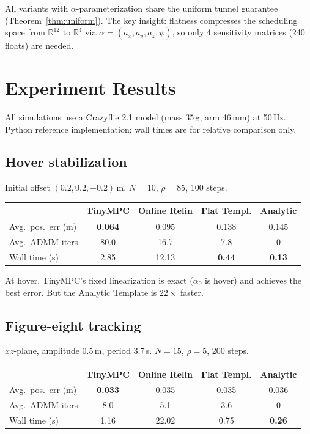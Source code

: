 \documentclass[11pt]{article}
\newcommand{\R}{\mathbb{R}}
\begin{document}
\noindent
All variants with $\alpha$-parameterization share the
uniform tunnel guarantee (Theorem~\ref{thm:uniform}).
The key insight: flatness compresses the scheduling space
from $\R^{12}$ to $\R^4$ via
$\alpha = (a_x, a_y, a_z, \psi)$,
so only 4 sensitivity matrices (240 floats) are needed.

\section{Experiment Results}\label{sec:results}

All simulations use a Crazyflie 2.1 model
(mass 35\,g, arm 46\,mm) at 50\,Hz.
Python reference implementation; wall times are
for relative comparison only.

\subsection{Hover stabilization}

Initial offset $(0.2, 0.2, -0.2)$\,m.
$N=10$, $\rho=85$, 100 steps.

\begin{center}
\renewcommand{\arraystretch}{1.2}
\begin{tabular}{@{}lcccc@{}}
\toprule
 & TinyMPC & Online Relin & Flat Templ. & Analytic \\
\midrule
Avg.\ pos.\ err (m) & \textbf{0.064} & 0.095 & 0.138 & 0.145 \\
Avg.\ ADMM iters     & 80.0 & 16.7 & 7.8 & 0 \\
Wall time (s)        & 2.85 & 12.13 & \textbf{0.44} & \textbf{0.13} \\
\bottomrule
\end{tabular}
\end{center}

At hover, TinyMPC's fixed linearization is exact
($\alpha_0$ is hover) and achieves the best error.
But the Analytic Template is $22\times$ faster.

\subsection{Figure-eight tracking}

$xz$-plane, amplitude 0.5\,m, period 3.7\,s.
$N=15$, $\rho=5$, 200 steps.

\begin{center}
\renewcommand{\arraystretch}{1.2}
\begin{tabular}{@{}lcccc@{}}
\toprule
 & TinyMPC & Online Relin & Flat Templ. & Analytic \\
\midrule
Avg.\ pos.\ err (m) & \textbf{0.033} & 0.035 & 0.035 & 0.036 \\
Avg.\ ADMM iters     & 8.0 & 5.1 & 3.6 & 0 \\
Wall time (s)        & 1.16 & 22.02 & 0.75 & \textbf{0.26} \\
\bottomrule
\end{tabular}
\end{center}
\end{document}
